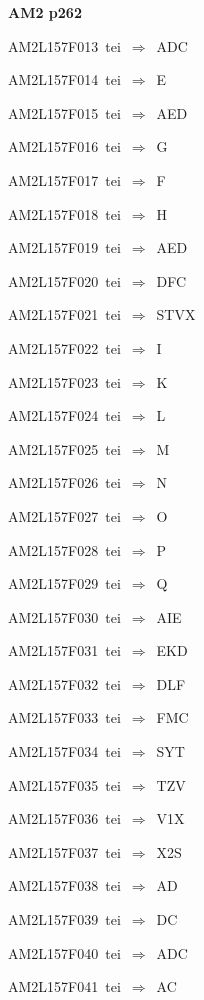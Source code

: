 \par\vfill\eject
{\bf\hfill AM2 p262\hfill\hbox{}}\par\bigskip
{\sixrm AM2L157F013\ {\sixit tei}\ }$\Rightarrow$\ ADC\par\smallskip
{\sixrm AM2L157F014\ {\sixit tei}\ }$\Rightarrow$\ E\par\smallskip
{\sixrm AM2L157F015\ {\sixit tei}\ }$\Rightarrow$\ AED\par\smallskip
{\sixrm AM2L157F016\ {\sixit tei}\ }$\Rightarrow$\ G\par\smallskip
{\sixrm AM2L157F017\ {\sixit tei}\ }$\Rightarrow$\ F\par\smallskip
{\sixrm AM2L157F018\ {\sixit tei}\ }$\Rightarrow$\ H\par\smallskip
{\sixrm AM2L157F019\ {\sixit tei}\ }$\Rightarrow$\ AED\par\smallskip
{\sixrm AM2L157F020\ {\sixit tei}\ }$\Rightarrow$\ DFC\par\smallskip
{\sixrm AM2L157F021\ {\sixit tei}\ }$\Rightarrow$\ STVX\par\smallskip
{\sixrm AM2L157F022\ {\sixit tei}\ }$\Rightarrow$\ I\par\smallskip
{\sixrm AM2L157F023\ {\sixit tei}\ }$\Rightarrow$\ K\par\smallskip
{\sixrm AM2L157F024\ {\sixit tei}\ }$\Rightarrow$\ L\par\smallskip
{\sixrm AM2L157F025\ {\sixit tei}\ }$\Rightarrow$\ M\par\smallskip
{\sixrm AM2L157F026\ {\sixit tei}\ }$\Rightarrow$\ N\par\smallskip
{\sixrm AM2L157F027\ {\sixit tei}\ }$\Rightarrow$\ O\par\smallskip
{\sixrm AM2L157F028\ {\sixit tei}\ }$\Rightarrow$\ P\par\smallskip
{\sixrm AM2L157F029\ {\sixit tei}\ }$\Rightarrow$\ Q\par\smallskip
{\sixrm AM2L157F030\ {\sixit tei}\ }$\Rightarrow$\ AIE\par\smallskip
{\sixrm AM2L157F031\ {\sixit tei}\ }$\Rightarrow$\ EKD\par\smallskip
{\sixrm AM2L157F032\ {\sixit tei}\ }$\Rightarrow$\ DLF\par\smallskip
{\sixrm AM2L157F033\ {\sixit tei}\ }$\Rightarrow$\ FMC\par\smallskip
{\sixrm AM2L157F034\ {\sixit tei}\ }$\Rightarrow$\ SYT\par\smallskip
{\sixrm AM2L157F035\ {\sixit tei}\ }$\Rightarrow$\ TZV\par\smallskip
{\sixrm AM2L157F036\ {\sixit tei}\ }$\Rightarrow$\ V1X\par\smallskip
{\sixrm AM2L157F037\ {\sixit tei}\ }$\Rightarrow$\ X2S\par\smallskip
{\sixrm AM2L157F038\ {\sixit tei}\ }$\Rightarrow$\ AD\par\smallskip
{\sixrm AM2L157F039\ {\sixit tei}\ }$\Rightarrow$\ DC\par\smallskip
{\sixrm AM2L157F040\ {\sixit tei}\ }$\Rightarrow$\ ADC\par\smallskip
{\sixrm AM2L157F041\ {\sixit tei}\ }$\Rightarrow$\ AC\par\smallskip

